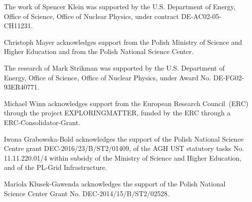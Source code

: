 The work of Spencer Klein was supported by the U.S. Department of Energy, Office of Science, Office of Nuclear Physics, under contract DE-AC02-05-CH11231.

Christoph Mayer acknowledges support from the Polish Ministry of Science and
Higher Education and from the Polish National Science Center.

The research of Mark Strikman was supported by the U.S. Department of Energy, Office of Science, Office of Nuclear Physics, under Award No. DE-FG02-93ER40771.

Michael Winn acknowledges support from the European Research Council~(ERC) through the project EXPLORINGMATTER, funded by the ERC through a ERC-Consolidator-Grant.

Iwona Grabowska-Bold acknowledges the support of the Polish National Science Centre grant DEC-2016/23/B/ST2/01409, of the AGH UST statutory tasks No. 11.11.220.01/4 within subsidy of the Ministry of Science and Higher Education, and of the PL-Grid Infrastructure.

Mariola Klusek-Gawenda acknowledges the support of the Polish National Science Center Grant No. DEC-2014/15/B/ST2/02528.
